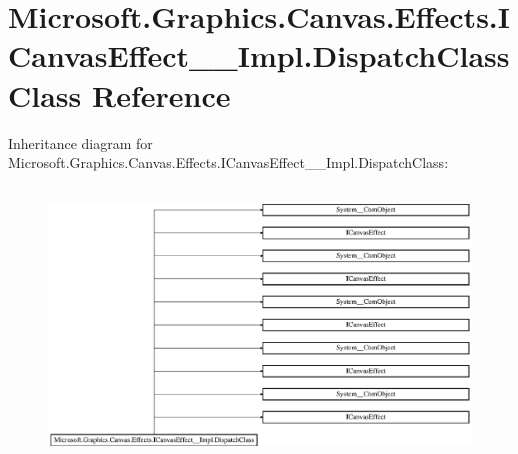\hypertarget{class_microsoft_1_1_graphics_1_1_canvas_1_1_effects_1_1_i_canvas_effect_____impl_1_1_dispatch_class}{}\section{Microsoft.\+Graphics.\+Canvas.\+Effects.\+I\+Canvas\+Effect\+\_\+\+\_\+\+Impl.\+Dispatch\+Class Class Reference}
\label{class_microsoft_1_1_graphics_1_1_canvas_1_1_effects_1_1_i_canvas_effect_____impl_1_1_dispatch_class}
Inheritance diagram for Microsoft.\+Graphics.\+Canvas.\+Effects.\+I\+Canvas\+Effect\+\_\+\+\_\+\+Impl.\+Dispatch\+Class\+:\begin{figure}[H]
\begin{center}
\leavevmode
\includegraphics[height=7.315915cm]{class_microsoft_1_1_graphics_1_1_canvas_1_1_effects_1_1_i_canvas_effect_____impl_1_1_dispatch_class}
\end{center}
\end{figure}
